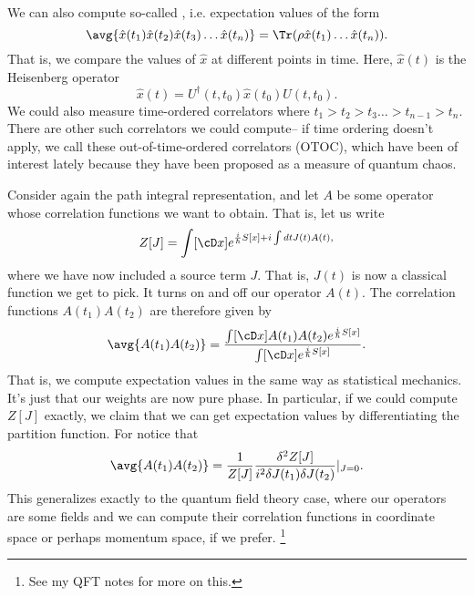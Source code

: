 We can also compute so-called , i.e. expectation values of the form
\begin{equation}
    \avg{\hat x(t_1) \hat x(t_2) \hat x(t_3) \ldots \hat x(t_n)} = \Tr (\rho \hat x(t_1) \ldots \hat x(t_n)).
\end{equation}
That is, we compare the values of $\hat x$ at different points in time. Here, $\hat x(t)$ is the Heisenberg operator
\begin{equation}
    \hat x(t) = U^\dagger(t,t_0) \hat x(t_0) U(t,t_0).
\end{equation}
We could also measure time-ordered correlators where $t_1 > t_2 > t_3 \ldots > t_{n-1} > t_n$. There are other such correlators we could compute-- if time ordering doesn't apply, we call these out-of-time-ordered correlators (OTOC), which have been of interest lately because they have been proposed as a measure of quantum chaos.

Consider again the path integral representation, and let $A$ be some operator whose correlation functions we want to obtain. That is, let us write
\begin{equation}
    Z[J] = \int [\cD x] e^{\frac{i}{\hbar} S[x]+i \int dt J(t) A(t),}
\end{equation}
where we have now included a source term $J$. That is, $J(t)$ is now a classical function we get to pick. It turns on and off our operator $A(t)$. The correlation functions $A(t_1) A(t_2)$ are therefore given by
\begin{align}
    \avg{A(t_1)A(t_2)} =\frac{\int [\cD x] A(t_1) A(t_2) e^{\frac{i}{\hbar}S[x]}}{\int [\cD x] e^{\frac{i}{\hbar} S[x]}}.
\end{align}
That is, we compute expectation values in the same way as statistical mechanics. It's just that our weights are now pure phase. In particular, if we could compute $Z[J]$ exactly, we claim that we can get expectation values by differentiating the partition function. For notice that
\begin{equation}
    \avg{A(t_1)A(t_2)} = \frac{1}{Z[J]} \frac{\delta^2 Z[J]}{i^2 \delta J(t_1) \delta J(t_2)}|_{J=0}.
\end{equation}
This generalizes exactly to the quantum field theory case, where our operators are some fields and we can compute their correlation functions in coordinate space or perhaps momentum space, if we prefer.%
    \footnote{See my QFT notes for more on this.}

